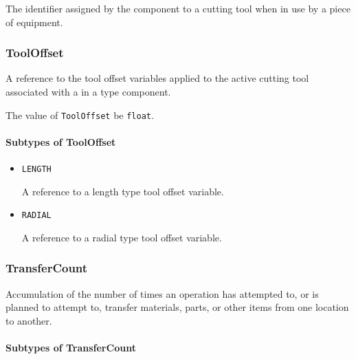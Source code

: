 The identifier assigned by the  component to a cutting tool when in use by a piece of equipment. 



\subsubsection{ToolOffset}
\label{sec:ToolOffset}



A reference to the tool offset variables applied to the active cutting tool associated with a  in a  type component.


The value of \texttt{ToolOffset} \MUST be \texttt{float}.


\paragraph{Subtypes of ToolOffset}\mbox{}
\label{sec:Subtypes of ToolOffset}

\begin{itemize}

\item \texttt{LENGTH}


A reference to a length type tool offset variable.

\item \texttt{RADIAL}


A reference to a radial type tool offset variable.


\end{itemize}





\subsubsection{TransferCount}
\label{sec:TransferCount}



Accumulation of the number of times an operation has attempted to, or is planned to attempt to, transfer materials, parts, or other items from one location to another.


\paragraph{Subtypes of TransferCount}\mbox{}
\label{sec:Subtypes of TransferCount}

